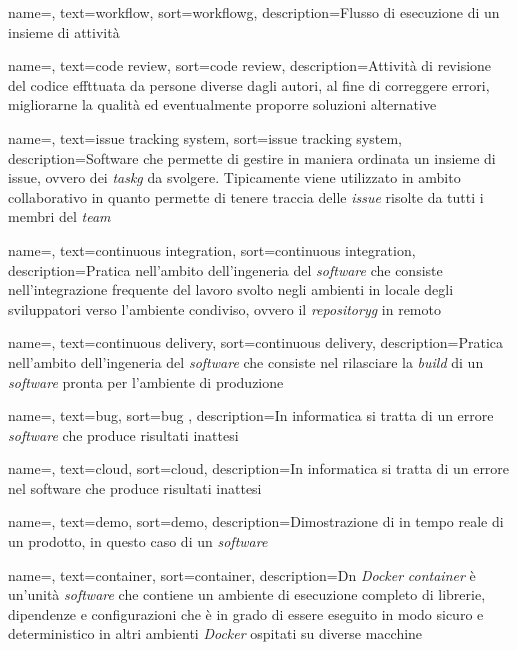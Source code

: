 {
    name=,
    text=workflow,
    sort=workflowg,
    description={Flusso di esecuzione di un insieme di attività}
}

{
    name=,
    text=code review,
    sort=code review,
    description={Attività di revisione del codice effttuata da persone diverse dagli autori, al fine di correggere errori, migliorarne la qualità ed eventualmente proporre soluzioni alternative}
}

{
    name=,
    text=issue tracking system,
    sort=issue tracking system,
    description={Software che permette di gestire in maniera ordinata un insieme di issue, ovvero dei \textit{\gls{taskg}} da svolgere. Tipicamente viene utilizzato in ambito collaborativo in quanto permette di tenere traccia delle \textit{issue} risolte da tutti i membri del \textit{team}}
}

{
    name=,
    text=continuous integration,
    sort=continuous integration,
    description={Pratica nell'ambito dell'ingeneria del \textit{software} che consiste nell'integrazione frequente del lavoro svolto negli ambienti in locale degli sviluppatori verso l'ambiente condiviso, ovvero il \textit{\gls{repositoryg}} in remoto}
}

{
    name=,
    text=continuous delivery,
    sort=continuous delivery,
    description={Pratica nell'ambito dell'ingeneria del \textit{software} che consiste nel rilasciare la \textit{build} di un \textit{software} pronta per l'ambiente di produzione}
}

{
    name=,
    text=bug,
    sort=bug ,
    description={In informatica si tratta di un errore \textit{software} che produce risultati inattesi}
}

{
    name=,
    text=cloud,
    sort=cloud,
    description={In informatica si tratta di un errore nel software che produce risultati inattesi}
}

{
    name=,
    text=demo,
    sort=demo,
    description={Dimostrazione di in tempo reale di un prodotto, in questo caso di un \textit{software}}
}

{
    name=,
    text=container,
    sort=container,
    description={Dn \textit{Docker} \textit{container} è un'unità \textit{software} che contiene un ambiente di esecuzione completo di librerie, dipendenze e configurazioni che è in grado di essere eseguito in modo sicuro e deterministico in altri ambienti \textit{Docker} ospitati su diverse macchine}
}

